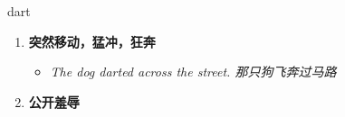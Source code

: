 
\begin{frame}
{\huge dart}
\begin{center}
\begin{enumerate}\Large
  \item \textbf{突然移动，猛冲，狂奔}
  \begin{itemize}
    \item \em{\Large{The dog darted across the street. 那只狗飞奔过马路}}
  \end{itemize}
  \item \textbf{公开羞辱}
\end{enumerate}
\end{center}
\end{frame}
